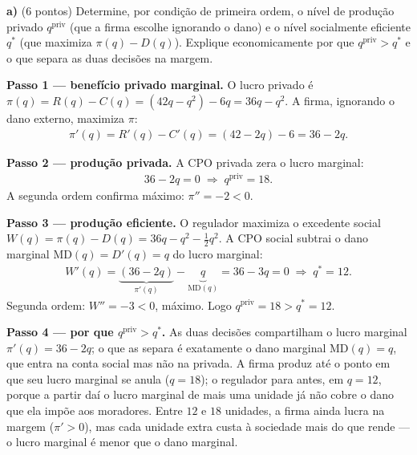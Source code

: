 \textbf{a)} (6 pontos) Determine, por condição de primeira ordem, o nível de produção privado $q^{\text{priv}}$ (que a firma escolhe ignorando o dano) e o nível socialmente eficiente $q^{*}$ (que maximiza $\pi(q)-D(q)$). Explique economicamente por que $q^{\text{priv}}>q^{*}$ e o que separa as duas decisões na margem.
\resolucaobox{5.5cm}
\begin{solucao}
\textbf{Passo 1 — benefício privado marginal.} O lucro privado é $\pi(q)=R(q)-C(q)=(42q-q^{2})-6q=36q-q^{2}$. A firma, ignorando o dano externo, maximiza $\pi$:
\begin{align*}
\pi'(q)=R'(q)-C'(q)=(42-2q)-6=36-2q.
\end{align*}

\textbf{Passo 2 — produção privada.} A CPO privada zera o lucro marginal:
\begin{align*}
36-2q=0\;\Longrightarrow\; q^{\text{priv}}=18.
\end{align*}
A segunda ordem confirma máximo: $\pi''=-2<0$.

\textbf{Passo 3 — produção eficiente.} O regulador maximiza o excedente social $W(q)=\pi(q)-D(q)=36q-q^{2}-\tfrac{1}{2}q^{2}$. A CPO social subtrai o dano marginal $\text{MD}(q)=D'(q)=q$ do lucro marginal:
\begin{align*}
W'(q)=\underbrace{(36-2q)}_{\pi'(q)}-\underbrace{q}_{\text{MD}(q)}=36-3q=0\;\Longrightarrow\; q^{*}=12.
\end{align*}
Segunda ordem: $W''=-3<0$, máximo. Logo $q^{\text{priv}}=18>q^{*}=12$.

\textbf{Passo 4 — por que $q^{\text{priv}}>q^{*}$.} As duas decisões compartilham o lucro marginal $\pi'(q)=36-2q$; o que as separa é exatamente o dano marginal $\text{MD}(q)=q$, que entra na conta social mas não na privada. A firma produz até o ponto em que seu lucro marginal se anula ($q=18$); o regulador para antes, em $q=12$, porque a partir daí o lucro marginal de mais uma unidade já não cobre o dano que ela impõe aos moradores. Entre $12$ e $18$ unidades, a firma ainda lucra na margem ($\pi'>0$), mas cada unidade extra custa à sociedade mais do que rende — o lucro marginal é menor que o dano marginal.


\end{solucao}
